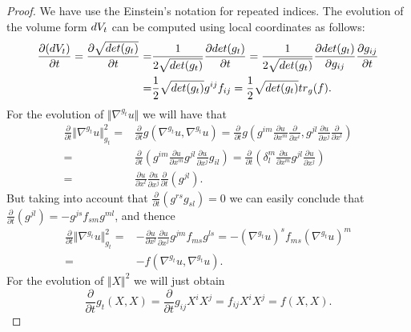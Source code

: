 \documentclass{amsart}
\theoremstyle{definition}
\theoremstyle{remark}
\newcommand{\tr}{{\rm tr}}
\newcommand{\V}{{\rm V}}
\begin{document}
\begin{proof}We have use the Einstein's notation for repeated indices.
  The evolution of the volume form $d\V_{t}$ can  be computed using local coordinates as  follows:
\begin{equation*}
    \begin{aligned}
        \frac{\partial (d\V_{t})}{ \partial t }=\frac{\partial \sqrt{det(g_t)}}{ \partial t }=& \frac{1}{2\sqrt{det(g_t)}} \frac{\partial det(g_t)}{\partial t}
        =  \frac{1}{2\sqrt{det(g_t)}} \frac{\partial det(g_t)}{\partial g_{ij}}\frac{\partial g_{ij}}{\partial t}\\
        =& \frac{1}{2}\sqrt{det(g_t)} g^{ij} f_{ij}
       = \frac{1}{2}\sqrt{det(g_t)} \tr_g(f).
    \end{aligned}
\end{equation*}
  For the evolution of   $\Vert \nabla^{g_t} u\Vert$ we will have that
  $$
  \begin{aligned}
\frac{\partial}{\partial t}\Vert \nabla^{g_t}u\Vert^2_{g_t}=&\frac{\partial}{\partial t}g\left(\nabla^{g_t}u,\nabla^{g_t}u\right)=\frac{\partial}{\partial t}g\left(g^{im}\frac{\partial u}{\partial x^m}\frac{\partial}{\partial x^i},g^{jl}\frac{\partial u}{\partial x^j}\frac{\partial}{\partial x^l}\right)\\
=&\frac{\partial}{\partial t}\left(g^{im}\frac{\partial u}{\partial x^m}g^{jl}\frac{\partial u}{\partial x^j}g_{il}\right)=\frac{\partial}{\partial t}\left(\delta^{m}_l\frac{\partial u}{\partial x^m}g^{jl}\frac{\partial u}{\partial x^j}\right)\\
=&\frac{\partial u}{\partial x^l}\frac{\partial u}{\partial x^j}\frac{\partial}{\partial t}\left(g^{jl}\right).
  \end{aligned}
$$  
But taking into account that
$
\frac{\partial}{\partial t}\left(g^{rs}g_{sl}\right)=0$
we can easily conclude that 
$\frac{\partial}{\partial t}\left(g^{jl}\right)=-g^{js}f_{sm}g^{ml}$,
and thence
\begin{equation*}
      \begin{aligned}
\frac{\partial}{\partial t}\Vert \nabla^{g_t}u\Vert^2_{g_t}=&-\frac{\partial u}{\partial x^l}\frac{\partial u}{\partial x^j}g^{jm}f_{ms}g^{ls}=- \left( \nabla^{g_t}u\right)^sf_{ms}\left( \nabla^{g_t}u\right)^m\\
=&-f(\nabla^{g_t}u,\nabla^{g_t} u).
  \end{aligned}
\end{equation*}
For the evolution of $\Vert X\Vert^2$ we will just obtain  
$$
\frac{\partial}{\partial t}g_t(X,X)=\frac{\partial}{\partial t}g_{ij}X^iX^j=f_{ij}X^iX^j=f(X,X).
$$
\end{proof}
\end{document}
